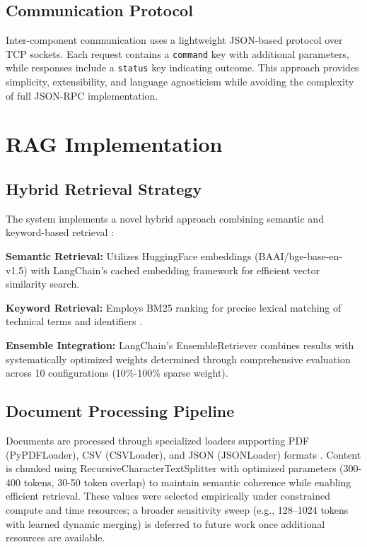 \documentclass[conference]{IEEEtran}
\begin{document}
\subsection{Communication Protocol}

Inter-component communication uses a lightweight JSON-based protocol over TCP sockets. Each request contains a \texttt{command} key with additional parameters, while responses include a \texttt{status} key indicating outcome. This approach provides simplicity, extensibility, and language agnosticism while avoiding the complexity of full JSON-RPC implementation.

\section{RAG Implementation}

\subsection{Hybrid Retrieval Strategy}

The system implements a novel hybrid approach combining semantic and keyword-based retrieval \cite{hybridretrieval}:

\textbf{Semantic Retrieval:} Utilizes HuggingFace embeddings (BAAI/bge-base-en-v1.5) \cite{bgeembeddings} with LangChain's cached embedding framework \cite{langchainjs} for efficient vector similarity search.

\textbf{Keyword Retrieval:} Employs BM25 ranking for precise lexical matching of technical terms and identifiers \cite{hybridretrieval}.

\textbf{Ensemble Integration:} LangChain's EnsembleRetriever \cite{langchainjs} combines results with systematically optimized weights determined through comprehensive evaluation across 10 configurations (10\%-100\% sparse weight).

\subsection{Document Processing Pipeline}

Documents are processed through specialized loaders supporting PDF (PyPDFLoader), CSV (CSVLoader), and JSON (JSONLoader) formats \cite{langchainjs}. Content is chunked using RecursiveCharacterTextSplitter with optimized parameters (300-400 tokens, 30-50 token overlap) to maintain semantic coherence while enabling efficient retrieval. These values were selected empirically under constrained compute and time resources; a broader sensitivity sweep (e.g., 128--1024 tokens with learned dynamic merging) is deferred to future work once additional resources are available.
\end{document}
